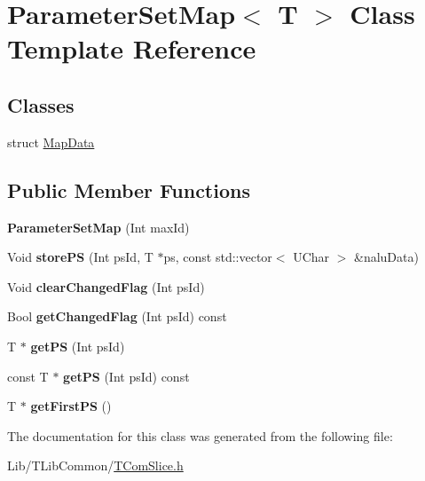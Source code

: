 \hypertarget{class_parameter_set_map}{}\section{Parameter\+Set\+Map$<$ T $>$ Class Template Reference}
\label{class_parameter_set_map}
\subsection*{Classes}
\begin{DoxyCompactItemize}
\item 
struct \hyperlink{struct_parameter_set_map_1_1_map_data}{Map\+Data}
\end{DoxyCompactItemize}
\subsection*{Public Member Functions}
\begin{DoxyCompactItemize}
\item 
\mbox{\label{class_parameter_set_map_a4ae2d9ea9b9849b32f2461a6ef5af0a8}} 
{\bfseries Parameter\+Set\+Map} (Int max\+Id)
\item 
\mbox{\label{class_parameter_set_map_a3947887d2a7d3c25e8ea116e4a2cf499}} 
Void {\bfseries store\+PS} (Int ps\+Id, T $\ast$ps, const std\+::vector$<$ U\+Char $>$ \&nalu\+Data)
\item 
\mbox{\label{class_parameter_set_map_a334a95b9e04f42dd0591e05fe014608b}} 
Void {\bfseries clear\+Changed\+Flag} (Int ps\+Id)
\item 
\mbox{\label{class_parameter_set_map_a6639df4f624f09ae33e4e01715e70d77}} 
Bool {\bfseries get\+Changed\+Flag} (Int ps\+Id) const
\item 
\mbox{\label{class_parameter_set_map_aac75ef3d5cf313c2a8d7dbc559d18651}} 
T $\ast$ {\bfseries get\+PS} (Int ps\+Id)
\item 
\mbox{\label{class_parameter_set_map_abe6156bdc16719b254f84cbaa582458d}} 
const T $\ast$ {\bfseries get\+PS} (Int ps\+Id) const
\item 
\mbox{\label{class_parameter_set_map_a16a0e734bc7c34fbc5ee30536faaf4f8}} 
T $\ast$ {\bfseries get\+First\+PS} ()
\end{DoxyCompactItemize}


The documentation for this class was generated from the following file\+:\begin{DoxyCompactItemize}
\item 
Lib/\+T\+Lib\+Common/\hyperlink{_t_com_slice_8h}{T\+Com\+Slice.\+h}\end{DoxyCompactItemize}
